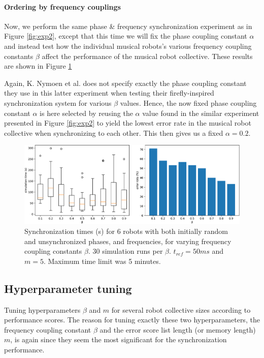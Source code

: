 			
			\paragraph{Ordering by frequency couplings}
			
			Now, we perform the same phase \& frequency synchronization experiment as in Figure \ref{fig:exp2}, except that this time we will fix the phase coupling constant $\alpha$ and instead test how the individual musical robots's various frequency coupling constants $\beta$ affect the performance of the musical robot collective. These results are shown in Figure \ref{fig:exp3}
			
			Again, K. Nymoen et al. does not specify exactly the phase coupling constant they use in this latter experiment when testing their firefly-inspired synchronization system for various $\beta$ values. Hence, the now fixed phase coupling constant $\alpha$ is here selected by reusing the $\alpha$ value found in the similar experiment presented in Figure \ref{fig:exp2} to yield the lowest error rate in the musical robot collective when synchronizing to each other. This then gives us a fixed $\alpha = 0.2$.
			
			\begin{figure}[ht!]
				\centering
				\includegraphics[width=\linewidth]{Assets/DocSegments/Chapters/ExperimentsAndResults/Figures/PerfScores/experiment3_perfScores.pdf}
				\caption{Synchronization times (s) for 6 robots with both initially random and unsynchronized phases, and frequencies, for varying frequency coupling constants $\beta$. 30 simulation runs per $\beta$. $t_{ref}=50ms$ and $m=5$. Maximum time limit was 5 minutes.}
				\label{fig:exp3}
			\end{figure}
			
			
		\subsection{Hyperparameter tuning}
		Tuning hyperparameters $\beta$ and $m$ for several robot collective sizes according to performance scores. The reason for tuning exactly these two hyperparameters, the frequency coupling constant $\beta$ and the error score list length (or memory length) $m$, is again since they seem the most significant for the synchronization performance.
		
	
